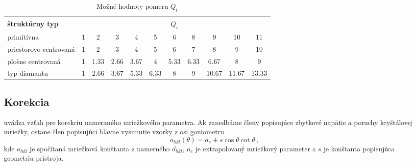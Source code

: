 \documentclass[a4paper, 10pt]{article}
\begin{document}
\begin{table}[h!]
\centering
\begin{tabular}{l|c|c|c|c|c|c|c|c|c|c}


štruktúrny typ	& \multicolumn {10}{c}{$Q_i$}\\
\midrule
primitívna &1	&2	&3	&4	&5	&6	&8	&9	&10	&11\\
priestorovo centrovaná &1	&2	&3	&4	&5	&6	&7	&8	&9	&10\\
plošne centrovaná &1	&1.33	&2.66	&3.67	&4	&5.33	&6.33	&6.67	&8	&9\\
typ diamantu	&1	&2.66	&3.67	&5.33	&6.33	&8	&9	&10.67	&11.67	&13.33\\

\end{tabular}
\newline
\vspace*{2pt}
\caption{Možné hodnoty pomeru $Q_i$ \label{tab:Qi}
}
\end{table}

\subsection*{Korekcia}
\cite{stud} uvádza vzťah pre korekciu nameraného mriežkového parametra. Ak zanedbáme členy popisujúce zbytkové napätie a poruchy kryštálovej mriežky, ostane člen popisujúci hlavne vysunutie vzorky z osi goniometru
\begin{equation}
\label{eq:teor:korekcia}
a_{hkl} (\theta) = a_e + s \cos\theta \cot \theta\,,
\end{equation}
kde $a_{hkl}$ je spočítaná mriežková konštanta z namerného $d_{hkl}$, $a_e$ je extrapolovaný mriežkový parameter a $s$  je konštanta popisujúca geometriu prístroja.
\end{document}
